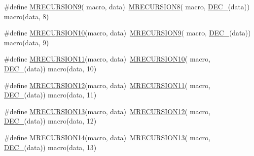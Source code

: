 \begin{DoxyCompactItemize}
\item 
\#define \mbox{\hyperlink{group__group__sam0__utils__mrecursion_gaa980bc4071d94fd850f3ee313460d56a}{M\+R\+E\+C\+U\+R\+S\+I\+O\+N9}}( macro,  data)~\mbox{\hyperlink{group__group__sam0__utils__mrecursion_gacca8590be6aada8914a304fd29258c46}{M\+R\+E\+C\+U\+R\+S\+I\+O\+N8}}(  macro, \mbox{\hyperlink{group__group__sam0__utils__mrecursion_ga1d23d683797679dca8c3512a54a5dcae}{D\+E\+C\+\_\+}}(data))   macro(data, 8)
\item 
\#define \mbox{\hyperlink{group__group__sam0__utils__mrecursion_ga3700eed97ae48ef8cbc22f11f4dbc78d}{M\+R\+E\+C\+U\+R\+S\+I\+O\+N10}}(macro,  data)~\mbox{\hyperlink{group__group__sam0__utils__mrecursion_gaa980bc4071d94fd850f3ee313460d56a}{M\+R\+E\+C\+U\+R\+S\+I\+O\+N9}}(  macro, \mbox{\hyperlink{group__group__sam0__utils__mrecursion_ga1d23d683797679dca8c3512a54a5dcae}{D\+E\+C\+\_\+}}(data))   macro(data, 9)
\item 
\#define \mbox{\hyperlink{group__group__sam0__utils__mrecursion_ga31b84f80986b74ca2475b949b3fb83e0}{M\+R\+E\+C\+U\+R\+S\+I\+O\+N11}}(macro,  data)~\mbox{\hyperlink{group__group__sam0__utils__mrecursion_ga3700eed97ae48ef8cbc22f11f4dbc78d}{M\+R\+E\+C\+U\+R\+S\+I\+O\+N10}}(  macro, \mbox{\hyperlink{group__group__sam0__utils__mrecursion_ga1d23d683797679dca8c3512a54a5dcae}{D\+E\+C\+\_\+}}(data))   macro(data, 10)
\item 
\#define \mbox{\hyperlink{group__group__sam0__utils__mrecursion_ga2729e6d7bf9ad170f0b715d38b75e5b8}{M\+R\+E\+C\+U\+R\+S\+I\+O\+N12}}(macro,  data)~\mbox{\hyperlink{group__group__sam0__utils__mrecursion_ga31b84f80986b74ca2475b949b3fb83e0}{M\+R\+E\+C\+U\+R\+S\+I\+O\+N11}}(  macro, \mbox{\hyperlink{group__group__sam0__utils__mrecursion_ga1d23d683797679dca8c3512a54a5dcae}{D\+E\+C\+\_\+}}(data))   macro(data, 11)
\item 
\#define \mbox{\hyperlink{group__group__sam0__utils__mrecursion_gac0cd2495b5a9a8b69ed7f701d5f15a47}{M\+R\+E\+C\+U\+R\+S\+I\+O\+N13}}(macro,  data)~\mbox{\hyperlink{group__group__sam0__utils__mrecursion_ga2729e6d7bf9ad170f0b715d38b75e5b8}{M\+R\+E\+C\+U\+R\+S\+I\+O\+N12}}(  macro, \mbox{\hyperlink{group__group__sam0__utils__mrecursion_ga1d23d683797679dca8c3512a54a5dcae}{D\+E\+C\+\_\+}}(data))   macro(data, 12)
\item 
\#define \mbox{\hyperlink{group__group__sam0__utils__mrecursion_ga5ae353c3b90a3403ded4a710d1c7a897}{M\+R\+E\+C\+U\+R\+S\+I\+O\+N14}}(macro,  data)~\mbox{\hyperlink{group__group__sam0__utils__mrecursion_gac0cd2495b5a9a8b69ed7f701d5f15a47}{M\+R\+E\+C\+U\+R\+S\+I\+O\+N13}}(  macro, \mbox{\hyperlink{group__group__sam0__utils__mrecursion_ga1d23d683797679dca8c3512a54a5dcae}{D\+E\+C\+\_\+}}(data))   macro(data, 13)

\end{DoxyCompactItemize}
